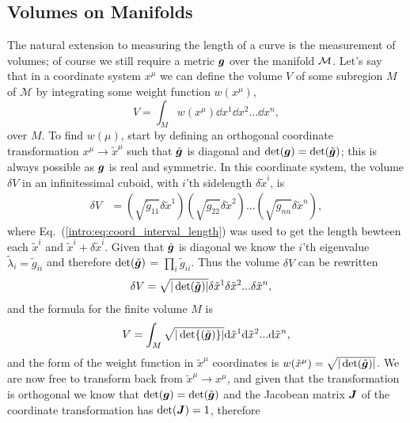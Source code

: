 \subsection{Volumes on Manifolds}

The natural extension to measuring the length of a curve is the measurement of volumes; of course we still require a metric $\boldsymbol{g}$ over the manifold $\mathcal{M}$. Let's say that in a coordinate system $x^\mu$ we can define the volume $V$ of some subregion $M$ of $\mathcal{M}$ by integrating some weight function $w(x^\mu)$,
\begin{equation}
V = \int_{M} w(x^\mu) \dd x^1 \dd x^2 ... \dd x^n,
\end{equation}
over $M$. To find $w(\mu)$, start by defining an orthogonal coordinate transformation $x^\mu \rightarrow \tilde{x}^\mu$ such that $\tilde{\boldsymbol{g}}$ is diagonal and $\det(\boldsymbol{g})=\det(\tilde{\boldsymbol{g}})$; this is always possible as $\boldsymbol{g}$ is real and symmetric. In this coordinate system, the volume $\delta V$ in an infinitessimal cuboid, with $i$'th sidelength $\delta \tilde{x}^i$, is
\begin{align}
\delta V &=  \left( \sqrt{\tilde{g}_{11}}\delta \tilde{x}^1 \right)\left(\sqrt{\tilde{g}_{22}}\delta \tilde{x}^2 \right)... \left(\sqrt{\tilde{g}_{nn}}\delta \tilde{x}^n\right) , 
\end{align}
where Eq.~(\ref{intro:eq:coord_interval_length}) was used to get the length bewteen each $\tilde{x}^i$ and $\tilde{x}^i + \delta \tilde{x}^i$. Given that $\tilde{\boldsymbol{g}}$ is diagonal we know the $i$'th eigenvalue $\tilde{\lambda}_i = \tilde{g}_{ii}$ and therefore $\det(\tilde{\boldsymbol{g}})$ = $\prod_i \tilde{g}_{ii}$. Thus the volume $\delta V$ can be rewritten
\begin{align}
\delta V &=  \sqrt{|\det(\tilde{\boldsymbol{g}})|}\delta \tilde{x}^1 \delta \tilde{x}^2  ... \delta \tilde{x}^n , 
\end{align} 
and the formula for the finite volume $M$ is
\begin{equation} \label{intro:eq:volume_curved}
V = \int_{M} \sqrt{|\det{(\tilde{\boldsymbol{g}})}|} \dd \tilde{x}^1 \dd \tilde{x}^2 ... \dd \tilde{x}^n,
\end{equation}
and the form of the weight function in $\tilde{x}^\mu$ coordinates is $w(\tilde{x}^\mu)= \sqrt{|\det(\tilde{\boldsymbol{g}})|}$.
We are now free to transform back from $\tilde{x}^\mu\rightarrow x^\mu$, and given that the transformation is orthogonal we know that $\det(\boldsymbol{g})=\det(\tilde{\boldsymbol{g}})$ and the Jacobean matrix $\boldsymbol{J}$ of the coordinate transformation has $\det({\boldsymbol{J}})=1$, therefore
